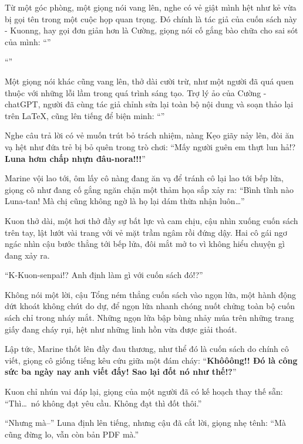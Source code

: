 \documentclass[../main.tex]{subfiles}
\begin{document}
Từ một góc phòng, một giọng nói vang lên, nghe có vẻ giật mình hệt như kẻ vừa bị gọi tên trong một cuộc họp quan trọng. Đó chính là tác giả của cuốn sách này - Kuonng, hay gọi đơn giản hơn là Cường, giọng nói cố gắng bào chữa cho sai sót của mình: ``''

``''

Một giọng nói khác cũng vang lên, thở dài cười trừ, như một người đã quá quen thuộc với những lỗi lầm trong quá trình sáng tạo. Trợ lý ảo của Cường - chatGPT, người đã cùng tác giả chỉnh sửa lại toàn bộ nội dung và soạn thảo lại trên \LaTeX, cũng lên tiếng để biện minh: ``''

Nghe câu trả lời có vẻ muốn trút bỏ trách nhiệm, nàng Kẹo giãy nảy lên, đòi ăn vạ hệt như đứa trẻ bị bỏ quên trong trò chơi: ``Mấy người guên em thựt lun hả!? \textbf{Luna hơm chấp nhựn đâu-nora!!!}''

Marine vội lao tới, ôm lấy cô nàng đang ăn vạ để tránh cô lại lao tới bếp lửa, giọng cô như đang cố gắng ngăn chặn một thảm họa sắp xảy ra: ``Bình tĩnh nào Luna-tan! Mà chị cũng không ngờ là họ lại dám thừa nhận luôn\dots''

Kuon thở dài, một hơi thở đầy sự bất lực và cam chịu, cậu nhìn xuống cuốn sách trên tay, lật lướt vài trang với vẻ mặt trầm ngâm rồi đứng dậy. Hai cô gái ngơ ngác nhìn cậu bước thẳng tới bếp lửa, đôi mắt mở to vì không hiểu chuyện gì đang xảy ra.

``K-Kuon-senpai!? Anh định làm gì với cuốn sách đó!?''

Không nói một lời, cậu Tổng ném thẳng cuốn sách vào ngọn lửa, một hành động dứt khoát không chút do dự, để ngọn lửa nhanh chóng nuốt chửng toàn bộ cuốn sách chỉ trong nháy mắt. Những ngọn lửa bập bùng nhảy múa trên những trang giấy đang cháy rụi, hệt như những linh hồn vừa được giải thoát.

Lập tức, Marine thốt lên đầy đau thương, như thể đó là cuốn sách do chính cô viết, giọng cô giống tiếng kêu cứu giữa một đám cháy: ``\textbf{Khôôông!! Đó là công sức ba ngày nay anh viết đấy! Sao lại đốt nó như thế!?}''

Kuon chỉ nhún vai đáp lại, giọng của một người đã có kế hoạch thay thế sẵn: ``Thì\dots\ nó không đạt yêu cầu. Không đạt thì đốt thôi.''

``Nhưng mà--'' Luna định lên tiếng, nhưng cậu đã cắt lời, giọng nhẹ tênh: ``Mà cũng đừng lo, vẫn còn bản PDF mà.''
\end{document}
